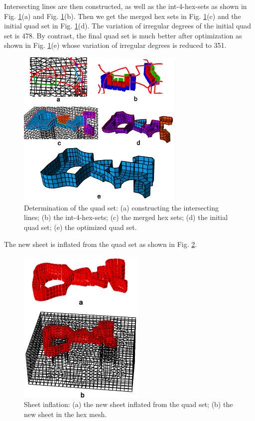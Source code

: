 \documentclass[final,5p,times,twocolumn]{elsarticle}
\begin{document}
Intersecting lines are then constructed, as well as the int-4-hex-sets as shown in Fig. \ref{fig:exam1_quad_set}(a) and Fig. \ref{fig:exam1_quad_set}(b). Then we get the merged hex sets in Fig. \ref{fig:exam1_quad_set}(c) and the initial quad set in Fig. \ref{fig:exam1_quad_set}(d). The variation of irregular degrees of the initial quad set is 478. By contrast, the final quad set is much better after optimization as shown in Fig. \ref{fig:exam1_quad_set}(e) whose variation of irregular degrees is reduced to 351.

\begin{figure}[htbp]
\begin{center}
\includegraphics[width=8cm]{figures/exam1_quad_set.png}
\caption{Determination of the quad set: (a) constructing the intersecting lines; (b) the int-4-hex-sets; (c) the merged hex sets; (d) the initial quad set; (e) the optimized quad set.}
\label{fig:exam1_quad_set}
\end{center}
\end{figure}

The new sheet is inflated from the quad set as shown in Fig. \ref{fig:exam1_sheet}.

\begin{figure}[htbp]
\begin{center}
\includegraphics[width=6cm]{figures/exam1_sheet.png}
\caption{Sheet inflation: (a) the new sheet inflated from the quad set; (b) the new sheet in the hex mesh.}
\label{fig:exam1_sheet}
\end{center}
\end{figure}
\end{document}
